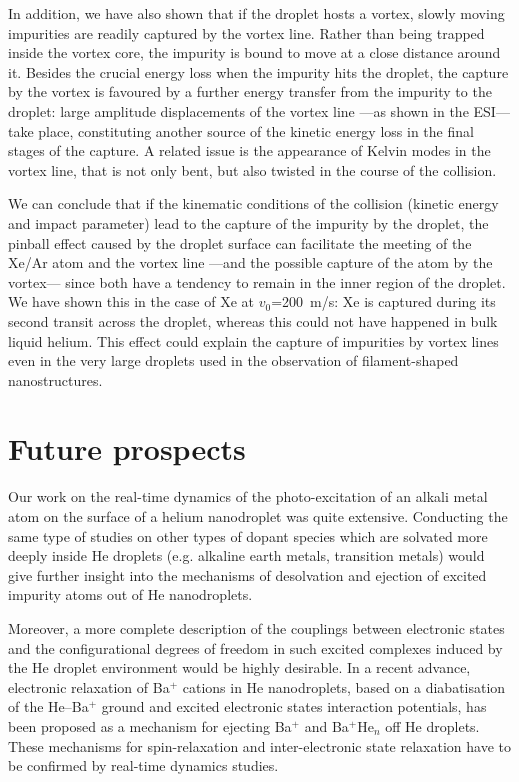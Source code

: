 	In addition, we have also shown that if the droplet hosts a vortex, slowly moving impurities are readily captured by the vortex line. Rather than being trapped inside the vortex core, the impurity is bound to move at a close distance around it. Besides the crucial energy loss when the impurity hits the droplet, the capture by the vortex is favoured by a further energy transfer from the impurity to the droplet: large amplitude displacements of the vortex line ---as shown in the ESI\citep{ESI}--- take place, constituting another source of the kinetic energy loss in the final stages of the capture. A related issue is the appearance of Kelvin modes in the vortex line, that is not only bent, but also twisted in the course of the collision.

	We can conclude that if the kinematic conditions of the collision (kinetic energy and impact parameter) lead to the capture of the impurity by the droplet, the pinball effect caused by the droplet surface can facilitate the meeting of the Xe/Ar atom and the vortex line ---and the possible capture of the atom by the vortex--- since both have a tendency to remain in the inner region of the droplet. We have shown this in the case of Xe at $v_0$=200~m/s: Xe is captured during its second transit across the droplet, whereas this could not have happened in bulk liquid helium\citep{Psh16}. This effect could explain the capture of impurities by vortex lines even in the very large droplets used in the observation of filament-shaped nanostructures.

	\section*{Future prospects}
		Our work on the real-time dynamics of the photo-excitation of an alkali metal atom on the surface of a helium nanodroplet was quite extensive. Conducting the same type of studies on other types of dopant species which are solvated more deeply inside He droplets (e.g. alkaline earth metals, transition metals) would give further insight into the mechanisms of desolvation and ejection of excited impurity atoms out of He nanodroplets\citep{Loginov:2007,Loginov:2012, Kautsch:2013,Lindebner:2014}.

		Moreover, a more complete description of the couplings between electronic states and the configurational degrees of freedom in such excited complexes induced by the He droplet environment would be highly desirable\citep{Closser:2014,Masson:2014}. In a recent advance, electronic relaxation of Ba$^+$ cations in He nanodroplets, based on a diabatisation of the He–Ba$^+$ ground and excited electronic states interaction potentials\citep{Vindel:2018}, has been proposed as a mechanism for ejecting Ba$^+$ and Ba$^+$He$_n$ off He droplets. These mechanisms for spin-relaxation and inter-electronic state relaxation have to be confirmed by real-time dynamics studies.

